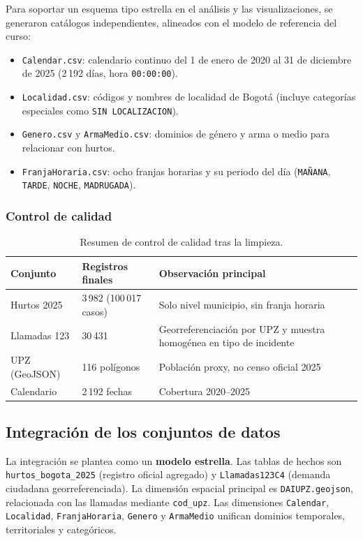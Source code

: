 \documentclass[12pt,letterpaper]{article}
\begin{document}
Para soportar un esquema tipo estrella en el análisis y las visualizaciones, se generaron catálogos independientes, alineados con el modelo de referencia del curso:
\begin{itemize}[noitemsep, topsep=0pt]
    \item \texttt{Calendar.csv}: calendario continuo del 1 de enero de 2020 al 31 de diciembre de 2025 (2\,192 días, hora \texttt{00:00:00}).
    \item \texttt{Localidad.csv}: códigos y nombres de localidad de Bogotá (incluye categorías especiales como \texttt{SIN LOCALIZACION}).
    \item \texttt{Genero.csv} y \texttt{ArmaMedio.csv}: dominios de género y arma o medio para relacionar con hurtos.
    \item \texttt{FranjaHoraria.csv}: ocho franjas horarias y su periodo del día (\texttt{MAÑANA}, \texttt{TARDE}, \texttt{NOCHE}, \texttt{MADRUGADA}).
\end{itemize}

\subsubsection{Control de calidad}

\begin{table}[H]
  \centering
  \caption{Resumen de control de calidad tras la limpieza.}
  \label{tab:qc-datasets}
  \small
  \begin{tabularx}{\linewidth}{lXX}
    \toprule
    \textbf{Conjunto} & \textbf{Registros finales} & \textbf{Observación principal} \\
    \midrule
    Hurtos 2025 & 3\,982 (100\,017 casos) & Solo nivel municipio, sin franja horaria \\
    Llamadas 123 & 30\,431 & Georreferenciación por UPZ y muestra homogénea en tipo de incidente \\
    UPZ (GeoJSON) & 116 polígonos & Población proxy, no censo oficial 2025 \\
    Calendario & 2\,192 fechas & Cobertura 2020--2025 \\
    \bottomrule
  \end{tabularx}
\end{table}

\subsection{Integración de los conjuntos de datos}

La integración se plantea como un \textbf{modelo estrella}. Las tablas de hechos son \texttt{hurtos\_bogota\_2025} (registro oficial agregado) y \texttt{Llamadas123C4} (demanda ciudadana georreferenciada). La dimensión espacial principal es \texttt{DAIUPZ.geojson}, relacionada con las llamadas mediante \texttt{cod\_upz}. Las dimensiones \texttt{Calendar}, \texttt{Localidad}, \texttt{FranjaHoraria}, \texttt{Genero} y \texttt{ArmaMedio} unifican dominios temporales, territoriales y categóricos.
\end{document}
